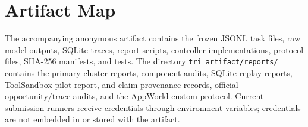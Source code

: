 \documentclass[10pt]{article}
\begin{document}
\section{Artifact Map}
\enlargethispage{2\baselineskip}
The accompanying anonymous artifact contains the frozen JSONL task files, raw model outputs,
SQLite traces, report scripts, controller implementations, protocol files, SHA-256 manifests,
and tests. The directory \texttt{tri\_artifact/reports/} contains the primary
cluster reports, component audits, SQLite replay reports, ToolSandbox pilot report, and
claim-provenance records, official opportunity/trace audits, and the AppWorld custom protocol.
Current submission runners receive credentials through environment
variables; credentials are not embedded in or stored with the artifact.
\end{document}
